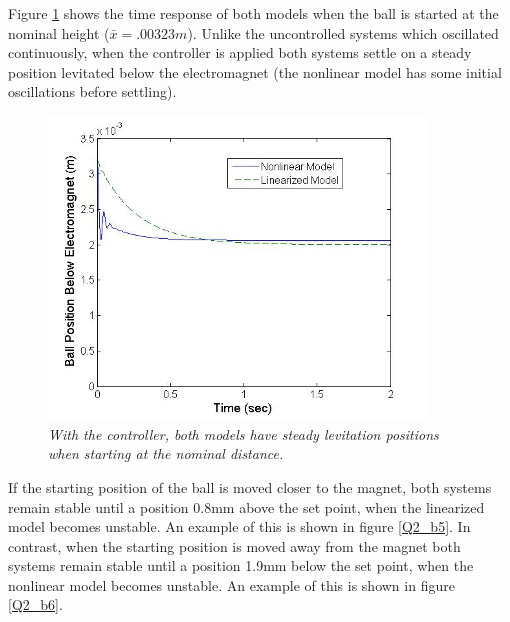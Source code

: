 \documentclass{article}
\theoremstyle{plain}
\theoremstyle{definition}
\theoremstyle{remark}
\begin{document}
Figure \ref{Q2_b4} shows the time response of both models when the ball is started at the nominal height ($\bar{x} = .00323m$). Unlike the uncontrolled systems which oscillated continuously, when the controller is applied both systems settle on a steady position levitated below the electromagnet (the nonlinear model has some initial oscillations before settling).\\

\begin{figure}[h!]
\begin{center}
\includegraphics[width = 10cm]{Part2bNoDisturbance.jpg}
\caption{\emph{With the controller, both models have steady levitation positions when starting at the nominal distance.}}
\label{Q2_b4}
\end{center}
\end{figure}

If the starting position of the ball is moved closer to the magnet, both systems remain stable until a position 0.8mm above the set point, when the linearized model becomes unstable. An example of this is shown in figure \ref{Q2_b5}. In contrast, when the starting position is moved away from the magnet both systems remain stable until a position 1.9mm below the set point, when the nonlinear model becomes unstable. An example of this is shown in figure \ref{Q2_b6}.\\
\end{document}
